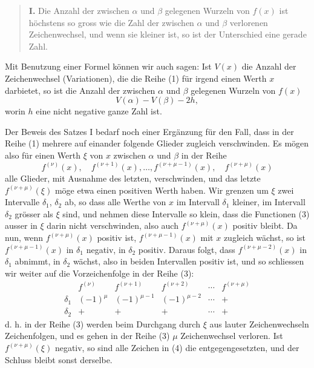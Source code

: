 \documentclass[11pt]{article}
\begin{document}
\begin{quote}
\textbf{I.} Die Anzahl der zwischen $\alpha$ und $\beta$ gelegenen Wurzeln von $f(x)$ ist höchstens so gross wie die Zahl der zwischen $\alpha$ und $\beta$ verlorenen Zeichenwechsel, und wenn sie kleiner ist, so ist der Unterschied eine gerade Zahl.
\end{quote}

Mit Benutzung einer Formel können wir auch sagen: Ist $V(x)$ die Anzahl der Zeichenwechsel (Variationen), die die Reihe (1) für irgend einen Werth $x$ darbietet, so ist die Anzahl der zwischen $\alpha$ und $\beta$ gelegenen Wurzeln von $f(x)$
\begin{equation}
        V(\alpha)-V(\beta)-2h,
\tag{2}
\end{equation}
worin $h$ eine nicht negative ganze Zahl ist.

Der Beweis des Satzes I bedarf noch einer Ergänzung für den Fall, dass in der Reihe (1) mehrere auf einander folgende Glieder zugleich verschwinden. Es mögen also für einen Werth $\xi$ von $x$ zwischen $\alpha$ und $\beta$ in der Reihe
\begin{equation}
        f^{(\nu)}(x),\quad f^{(\nu+1)}(x),\ldots,
        f^{(\nu+\mu-1)}(x),\quad f^{(\nu+\mu)}(x)
\tag{3}
\end{equation}
alle Glieder, mit Ausnahme des letzten, verschwinden, und das letzte $f^{(\nu+\mu)}(\xi)$ möge etwa einen positiven Werth haben. Wir grenzen um $\xi$ zwei Intervalle $\delta_1$, $\delta_2$ ab, so dass alle Werthe von $x$ im Intervall $\delta_1$ kleiner, im Intervall $\delta_2$ grösser als $\xi$ sind, und nehmen diese Intervalle so klein, dass die Functionen (3) ausser in $\xi$ darin nicht verschwinden, also auch $f^{(\nu+\mu)}(x)$ positiv bleibt. Da nun, wenn $f^{(\nu+\mu)}(x)$ positiv ist, $f^{(\nu+\mu-1)}(x)$ mit $x$ zugleich wächst, so ist $f^{(\nu+\mu-1)}(x)$ in $\delta_1$ negativ, in $\delta_2$ positiv. Daraus folgt, dass $f^{(\nu+\mu-2)}(x)$ in $\delta_1$ abnimmt, in $\delta_2$ wächst, also in beiden Intervallen positiv ist, und so schliessen wir weiter auf die Vorzeichenfolge in der Reihe (3):
\[
\begin{array}{c|ccccc}
& f^{(\nu)} & f^{(\nu+1)} & f^{(\nu+2)} & \cdots & f^{(\nu+\mu)}\\ \hline
\delta_1&(-1)^\mu&(-1)^{\mu-1}&(-1)^{\mu-2}&\cdots&+\\
\delta_2&+&+&+&\cdots&+
\end{array}
\tag{4}
\]
d. h. in der Reihe (3) werden beim Durchgang durch $\xi$ aus lauter Zeichenwechseln Zeichenfolgen, und es gehen in der Reihe (3) $\mu$ Zeichenwechsel verloren. Ist $f^{(\nu+\mu)}(\xi)$ negativ, so sind alle Zeichen in (4) die entgegengesetzten, und der Schluss bleibt sonst derselbe.
\end{document}
